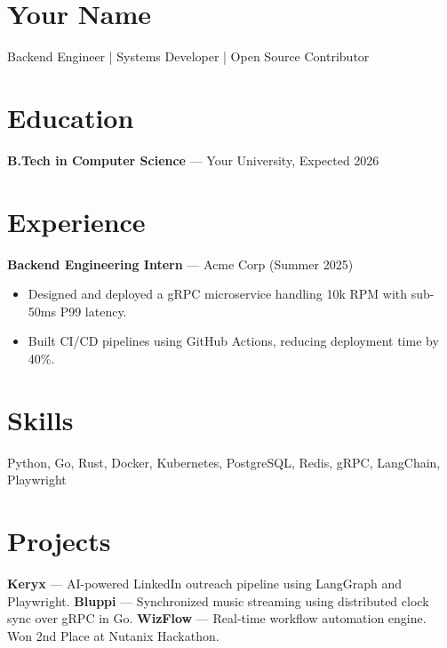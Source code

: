 \documentclass[letterpaper,11pt]{article}
\begin{document}
\section*{Your Name}
Backend Engineer | Systems Developer | Open Source Contributor

\section*{Education}
\textbf{B.Tech in Computer Science} — Your University, Expected 2026

\section*{Experience}
\textbf{Backend Engineering Intern} — Acme Corp (Summer 2025)
\begin{itemize}
  \item Designed and deployed a gRPC microservice handling 10k RPM with sub-50ms P99 latency.
  \item Built CI/CD pipelines using GitHub Actions, reducing deployment time by 40\%.
\end{itemize}

\section*{Skills}
Python, Go, Rust, Docker, Kubernetes, PostgreSQL, Redis, gRPC, LangChain, Playwright

\section*{Projects}
\textbf{Keryx} — AI-powered LinkedIn outreach pipeline using LangGraph and Playwright.
\textbf{Bluppi} — Synchronized music streaming using distributed clock sync over gRPC in Go.
\textbf{WizFlow} — Real-time workflow automation engine. Won 2nd Place at Nutanix Hackathon.
\end{document}
